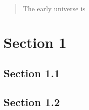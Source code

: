 \documentclass[a4paper]{article}
\begin{document}
 
 
\maketitle

\begin{abstract}
    The early universe is 
\end{abstract}


\tableofcontents
\newpage

\section{Section 1}
\lipsum
\subsection{Section 1.1}
\lipsum 
\lipsum
\subsection{Section 1.2}
\lipsum 
\lipsum

\nocite{taplecture} 
\printbibliography

\immediate{}
\end{document}
